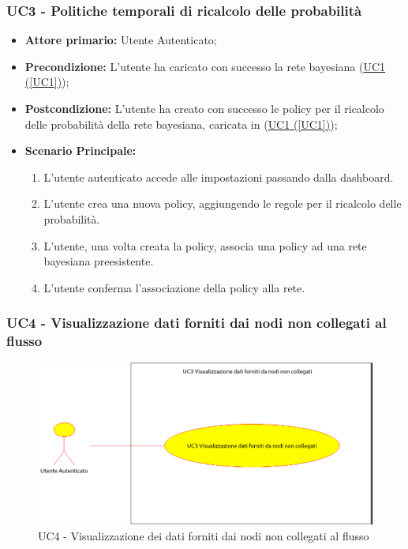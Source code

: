 \newpage
\subsubsection{UC3 - Politiche temporali di ricalcolo delle probabilità}\label{UC3}

\begin{itemize}
	\item \textbf{Attore primario:} Utente Autenticato; 
	\item \textbf{Precondizione:} L'utente ha caricato con successo la rete bayesiana (\hyperref[UC1]{UC1 (\ref*{UC1})});

	\item \textbf{Postcondizione:} L'utente ha creato con successo le policy per il ricalcolo delle probabilità della rete bayesiana, caricata in (\hyperref[UC1]{UC1 (\ref*{UC1})});	
	\item \textbf{Scenario Principale:}

	\begin{enumerate}
		\item L'utente autenticato accede alle impostazioni passando dalla dashboard. 
		\item L'utente crea una nuova policy, aggiungendo le regole per il ricalcolo delle probabilità. 
		\item L'utente, una volta creata la policy, associa una policy ad una rete bayesiana preesistente. 
		\item L'utente conferma l'associazione della policy alla rete. 
	\end{enumerate}
	
\end{itemize}



\subsubsection{UC4 - Visualizzazione dati forniti dai nodi non collegati al flusso}\label{UC4}

\begin{figure}[H]
\centering
\includegraphics[scale=0.4]{./images/UC4.png}
\caption{UC4 - Visualizzazione dei dati forniti dai nodi non collegati al flusso}
\end{figure}

